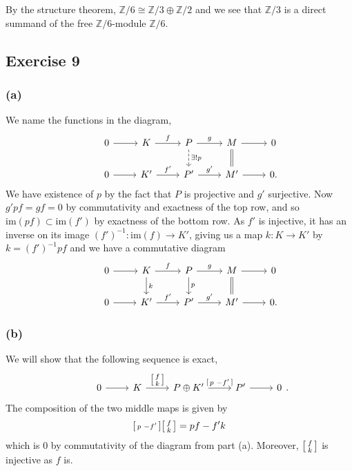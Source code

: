 \documentclass{article}
\theoremstyle{definition}
\newcommand{\Z}{\mathbb{Z}}
\newcommand{\im}{\text{im}}
\begin{document}
By the structure theorem, $\Z/6 \cong \Z/3 \oplus \Z/2$ and we see that $\Z/3$
is a direct summand of the free $\Z/6$-module $\Z/6$.

\subsection*{Exercise 9}
\subsubsection*{(a)}

We name the functions in the diagram,
\[
\begin{tikzcd}
	& 0
	\arrow{r}
	& K
	\arrow{r}{f}
	& P
	\arrow{r}{g}
	\arrow[dashed]{d}{\exists ! p}
	& M
	\arrow{r}
	\arrow[equal]{d}
	& 0 \\
	& 0
	\arrow{r}
	& K'
	\arrow{r}{f'}
	& P'
	\arrow{r}{g'}
	& M'
	\arrow{r}
	& 0.
\end{tikzcd}
\] 
We have existence of $p$ by the fact that $P$ is projective and $g'$
surjective. Now $g'pf = gf = 0$ by commutativity and exactness of the top row,
and so $\im(pf) \subset \im(f')$ by exactness of the bottom row. As $f'$ is
injective, it has an inverse on its image $(f')^{-1} : \im(f) \to K'$, giving
us a map $k : K \to K'$ by $k = (f')^{-1} pf$ and we have a commutative diagram
\[
\begin{tikzcd}
	& 0
	\arrow{r}
	& K
	\arrow{r}{f}
	\arrow{d}{k}
	& P
	\arrow{r}{g}
	\arrow{d}{p}
	& M
	\arrow{r}
	\arrow[equal]{d}
	& 0 \\
	& 0
	\arrow{r}
	& K'
	\arrow{r}{f'}
	& P'
	\arrow{r}{g'}
	& M'
	\arrow{r}
	& 0.
\end{tikzcd}
\]

\subsubsection*{(b)}

We will show that the following sequence is exact,
\[
	\begin{tikzcd}[ampersand replacement=\&]
		\& 0
		\arrow{r}
		\& K
		\arrow{r}{\begin{bsmallmatrix} f \\ k \end{bsmallmatrix}}
		\& P \oplus K'
		\arrow{r}{\begin{bsmallmatrix} p & -f' \end{bsmallmatrix}}
		\& P'
		\arrow{r}
		\& 0
	\end{tikzcd}.
\] 
The composition of the two middle maps is given by
\[
	\begin{bsmallmatrix} p & -f' \end{bsmallmatrix}
	\begin{bsmallmatrix} f \\ k \end{bsmallmatrix}
	=
	pf - f'k
\] 
which is $0$ by commutativity of the diagram from part (a). Moreover,
$\begin{bsmallmatrix} f \\ k \end{bsmallmatrix}$ is injective as $f$ is. \\
\end{document}
